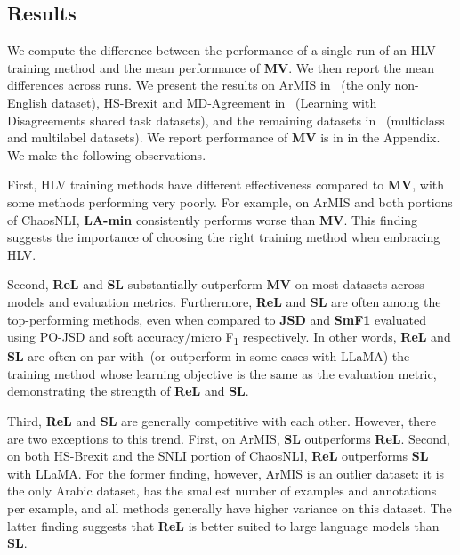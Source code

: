 \documentclass[shortpaper]{clv2025}
\newcommand{\pojsd}{PO-JSD\xspace}
\newcommand{\methname}[1]{\textbf{#1}}  %
\begin{document}
\subsection{Results}

We compute the difference between the performance of a single run of an HLV
training method and the mean performance of \methname{MV}. We then report the
mean differences across runs. We present the results on ArMIS in
~(the only non-English dataset), HS-Brexit and
MD-Agreement in ~(Learning with Disagreements
shared task datasets), and the remaining datasets in
~(multiclass and multilabel datasets). We report
performance of \methname{MV} is in  in the Appendix. We
make the following observations.

First, HLV training methods have different effectiveness compared to
\methname{MV}, with some methods performing very poorly. For example, on ArMIS
and both portions of ChaosNLI, \methname{LA-min} consistently performs worse
than \methname{MV}. This finding suggests the importance of choosing the right
training method when embracing HLV.

Second, \methname{ReL} and \methname{SL} substantially outperform \methname{MV}
on most datasets across models and evaluation metrics. Furthermore,
\methname{ReL} and \methname{SL} are often among the top-performing methods,
even when compared to \methname{JSD} and \methname{SmF1} evaluated using
\pojsd and soft accuracy/micro F\textsubscript{1} respectively. In other
words, \methname{ReL} and \methname{SL} are often on par with~(or outperform in
some cases with LLaMA) the training method whose learning objective is the same
as the evaluation metric, demonstrating the strength of \methname{ReL} and
\methname{SL}.

Third, \methname{ReL} and \methname{SL} are generally competitive with each
other. However, there are two exceptions to this trend. First, on ArMIS,
\methname{SL} outperforms \methname{ReL}. Second, on both HS-Brexit and the SNLI
portion of ChaosNLI, \methname{ReL} outperforms \methname{SL} with LLaMA. For
the former finding, however, ArMIS is an outlier dataset: it is the only Arabic
dataset, has the smallest number of examples and annotations per example, and
all methods generally have higher variance on this dataset. The latter finding
suggests that \methname{ReL} is better suited to large language models than
\methname{SL}.
\end{document}
